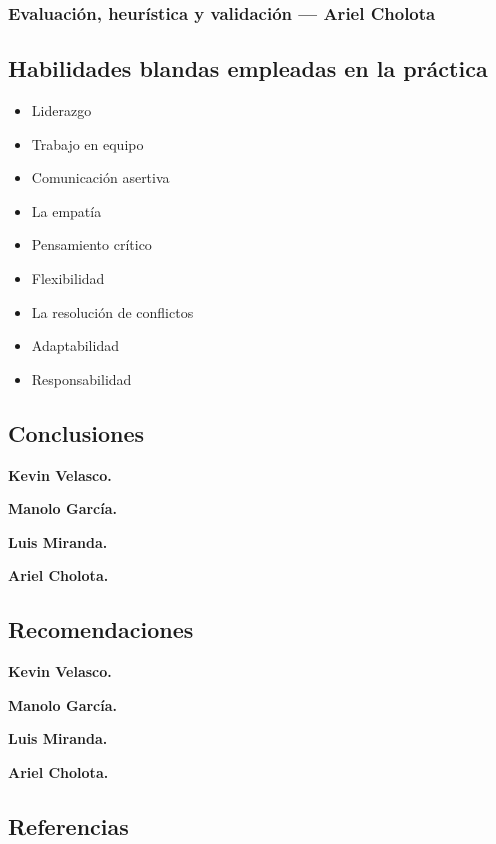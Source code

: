 \documentclass{article}
\begin{document}
\subsubsection{Evaluación, heurística y validación --- Ariel Cholota}


\subsection{Habilidades blandas empleadas en la práctica}
\begin{itemize}
    \item[$\square$] Liderazgo
    \item[$\blacksquare$] Trabajo en equipo
    \item[$\square$] Comunicación asertiva
    \item[$\square$] La empatía
    \item[$\blacksquare$] Pensamiento crítico
    \item[$\square$] Flexibilidad
    \item[$\square$] La resolución de conflictos
    \item[$\square$] Adaptabilidad
    \item[$\blacksquare$] Responsabilidad
\end{itemize}

\subsection{Conclusiones}
\textbf{Kevin Velasco.} 

\textbf{Manolo García.} 

\textbf{Luis Miranda.} 

\textbf{Ariel Cholota.} 

\subsection{Recomendaciones}
\textbf{Kevin Velasco.} 

\textbf{Manolo García.} 

\textbf{Luis Miranda.} 

\textbf{Ariel Cholota.} 

\subsection{Referencias}

\vspace{-3em}
\renewcommand{\refname}{}
\nocite{*}


\end{document}
